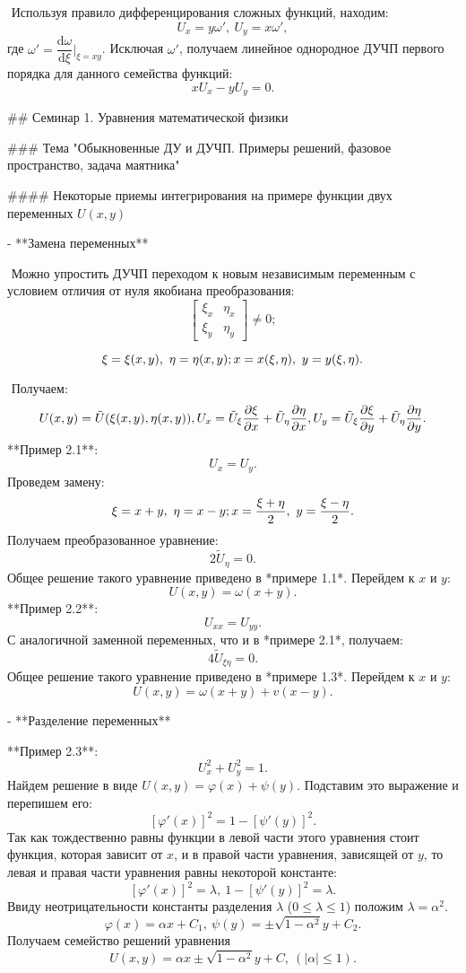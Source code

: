 ​	Используя правило дифференцирования сложных функций, находим:
$$
U_x = y\omega',\ U_y = x\omega',
$$
где $\omega' = \dfrac{\mathrm{d} \omega}{\mathrm{d} \xi}|_{ξ=xy}$. Исключая $\omega'$, получаем линейное однородное ДУЧП первого порядка для данного семейства функций:
$$
xU_x - yU_y = 0.
$$

## Семинар 1. Уравнения математической физики

### Тема "Обыкновенные ДУ и ДУЧП. Примеры решений, фазовое пространство, задача маятника"

#### Некоторые приемы интегрирования на примере функции двух переменных $U(x,y)$

- **Замена переменных**

  ​    Можно упростить ДУЧП переходом к новым независимым переменным с условием отличия от нуля якобиана преобразования:
  $$
  \begin{bmatrix}
  \xi_x & \eta_x
  \\
  \xi_y & \eta_y
  \end{bmatrix} \neq 0;
  $$

  $$
  \xi = \xi(x,y),\ \eta = \eta(x,y);\\
  x = x(\xi,\eta),\ y = y(\xi,\eta).
  $$

  ​    Получаем:
  $$
  U(x,y) =  \tilde U(\xi(x,y),\eta(x,y)),\\
  U_x = \tilde U_\xi \frac{\partial\xi}{\partial x} + \tilde U_\eta \frac{\partial\eta}{\partial x},\\
  U_y = \tilde U_\xi \frac{\partial\xi}{\partial y} + \tilde U_\eta \frac{\partial\eta}{\partial y}.
  $$
  **Пример 2.1**:
  $$
  U_x = U_y.
  $$
  ​    Проведем замену:
  $$
  \xi = x + y,\ \eta = x - y;\\
  x = \frac{\xi + \eta}{2},\ y = \frac{\xi - \eta}{2}.
  $$
  ​    Получаем преобразованное уравнение:
  $$
  2\tilde U_\eta = 0.
  $$
  ​    Общее решение такого уравнение приведено в *примере 1.1*. Перейдем к $x$ и $y$:
  $$
  U(x,y) = \omega(x+y).
  $$
  **Пример 2.2**:
  $$
  U_{xx} = U_{yy}.
  $$
  ​    С аналогичной заменной переменных, что и в *примере 2.1*, получаем:
  $$
  4\tilde U_{\xi\eta} = 0.
  $$
  ​    Общее решение такого уравнение приведено в *примере 1.3*. Перейдем к $x$ и $y$:
  $$
  U(x,y) = \omega(x+y) + v(x-y).
  $$

- **Разделение переменных**

  **Пример 2.3**:
  $$
  U_x^2 + U_y^2 = 1.
  $$
  ​    Найдем решение в виде $U(x,y) = \varphi(x) + \psi(y)$. Подставим это выражение и перепишем его:
  $$
  [\varphi'(x)]^2 = 1 - [\psi'(y)]^2.
  $$
  ​    Так как тождественно равны функции в левой части этого уравнения стоит функция, которая зависит от $x$, и в правой части уравнения, зависящей от $y$, то левая и правая части уравнения равны некоторой константе:
  $$
  [\varphi'(x)]^2 = \lambda, \  1 - [\psi'(y)]^2 = \lambda.
  $$
  ​    Ввиду неотрицательности константы разделения $\lambda$ ($0 \le \lambda \le 1 $) положим $\lambda = \alpha^2$.
  $$
  \varphi(x) = \alpha x + C_1,\ \psi(y) = \pm \sqrt{1-\alpha^2}y + C_2.
  $$
  ​    Получаем семейство решений уравнения
  $$
  U(x,y) = \alpha x \pm \sqrt{1-\alpha^2}y + C,\ (|\alpha| \le 1).
  $$

